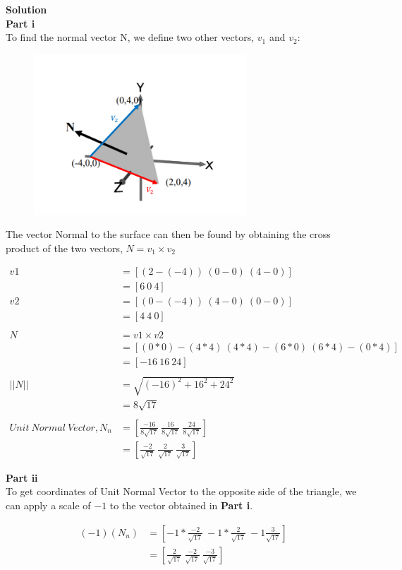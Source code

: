 \documentclass{article}
\begin{document}
\textbf{Solution}\\
\textbf{Part i}\\
To find the normal vector N, we define two other vectors, \(v_1\) and \(v_2\):
\begin{figure}[H]
    \includegraphics[width=8cm]{fig/q4_1.PNG}
    \centering
\end{figure}

The vector Normal to the surface can then be found by obtaining the cross product of the
two vectors, \(N = v_1 \times v_2\)

\[
        \begin{split}
            v1 &= [(2 - (-4))\ (0 - 0)\ (4 - 0)]
            \\
            &= [6\ 0\ 4]
            \\
            v2 &= [(0 - (-4))\ (4 - 0)\ (0 - 0)]
            \\
            &= [4\ 4\ 0]
            \\\\
            N &= v1 \times v2
            \\
            &= [(0*0)-(4*4)\ (4*4)-(6*0)\ (6*4)-(0*4)]
            \\
            &= [-16\ 16\ 24]
            \\\\
            ||N|| &= \sqrt{(-16)^{2} + 16^{2} + 24^{2}}
            \\
            &= 8\sqrt{17}
            \\\\
            Unit\ Normal\ Vector, N_n &= \left[\frac{-16}{8\sqrt{17}}\ \frac{16}{8\sqrt{17}}\ \frac{24}{8\sqrt{17}}\right]
            \\
            &= \left[\frac{-2}{\sqrt{17}}\ \frac{2}{\sqrt{17}}\ \frac{3}{\sqrt{17}}\right]
        \end{split}
    \]

    \textbf{Part ii}\\
    To get coordinates of Unit Normal Vector to the opposite side of the triangle, we can apply a scale of \(-1\)
    to the vector obtained in \textbf{Part i}.

    \[
        \begin{split}
        (-1)(N_n) &= \left[-1*\frac{-2}{\sqrt{17}}\ -1*\frac{2}{\sqrt{17}}\ -1\frac{3}{\sqrt{17}}\right]
        \\
        &= \left[\frac{2}{\sqrt{17}}\ \frac{-2}{\sqrt{17}}\ \frac{-3}{\sqrt{17}}\right]
        \end{split}
    \]
    
\end{document}
